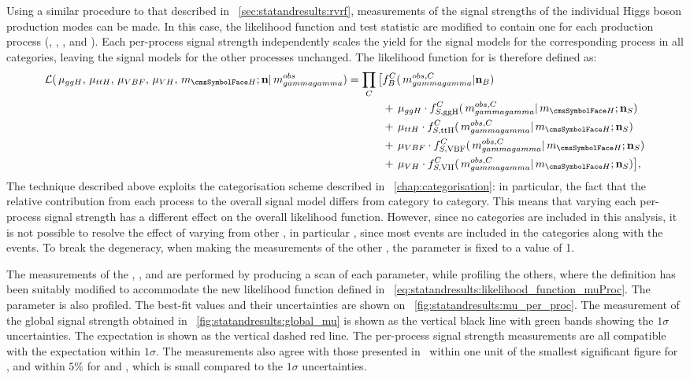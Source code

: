 Using a similar procedure to that described in \Sec~\ref{sec:statandresults:rvrf}, measurements of the signal strengths of the individual Higgs boson production modes can be made. In this case, the likelihood function and test statistic are modified to contain one \POI for each production process (\muggH, \muVBF, \muVH, and \muttH). Each per-process signal strength independently scales the yield for the signal models for the corresponding process in all categories, leaving the signal models for the other processes unchanged. The likelihood function for is therefore defined as:
\begin{equation}
\label{eq:statandresults:likelihood_function_muProc}
\begin{split}
\mathcal{L}(\muggH, \muttH,\muVBF,\muVH, \mH; \mathbf{n} | \mgg^{obs} ) = \prod_C \big[{} &f^C_B(\mgg^{obs,C} | \mathbf{n}_B ) \\ 
&+\muggH\cdot f^C_{S,{\text{ggH}}}(\mgg^{obs,C} |\mH ; \mathbf{n}_S) \\ 
&+\muttH\cdot f^C_{S,{\text{ttH}}}(\mgg^{obs,C} |\mH ; \mathbf{n}_S) \\ 
&+\muVBF\cdot f^C_{S,{\text{VBF}}}(\mgg^{obs,C} |\mH ; \mathbf{n}_S) \\
&+\muVH \cdot f^C_{S,{\text{VH}}}(\mgg^{obs,C} |\mH ; \mathbf{n}_S){}\big], \\ 
\end{split}
\end{equation}
The technique described above exploits the categorisation scheme described in \Chapter~\ref{chap:categorisation}: in particular, the fact that the relative contribution from each process to the overall signal model differs from category to category. This means that varying each per-process signal strength has a different effect on the overall likelihood function. However, since no \VHTag categories are included in this analysis, it is not possible to resolve the effect of varying \muVH from other \POI\s, in particular \muggH, since most \VH events are included in the \Untagged categories along with the \ggH events. To break the degeneracy, when making the measurements of the other \POI\s, the parameter \muVH is fixed to a value of 1. 

The measurements of the \muggH, \muVBF, and \muttH are performed by producing a \DNLL scan of each parameter, while profiling the others, where the \DNLL definition has been suitably modified to accommodate the new likelihood function defined in \Eq~\ref{eq:statandresults:likelihood_function_muProc}. The \mH parameter is also profiled. The best-fit values and their uncertainties are shown on \Fig~\ref{fig:statandresults:mu_per_proc}. The measurement of the global signal strength obtained in \Sec~\ref{fig:statandresults:global_mu} is shown as the vertical black line with green bands showing the $1\sigma$ uncertainties. The \SM expectation is shown as the vertical dashed red line. The per-process signal strength measurements are all compatible with the \SM expectation within $1\sigma$. The measurements also agree with those presented in~\cite{CMS-PAS-HIG-16-020} within one unit of the smallest significant figure for \muggH, and within $5\%$ for \muVBF and \muttH, which is small compared to the $1\sigma$ uncertainties. 

